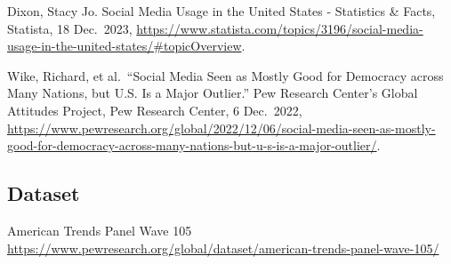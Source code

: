 \documentclass[
]{article}
\begin{document}
Dixon, Stacy Jo. Social Media Usage in the United States - Statistics \&
Facts, Statista, 18 Dec.~2023,
\url{https://www.statista.com/topics/3196/social-media-usage-in-the-united-states/\#topicOverview}.

Wike, Richard, et al.~``Social Media Seen as Mostly Good for Democracy
across Many Nations, but U.S. Is a Major Outlier.'' Pew Research
Center's Global Attitudes Project, Pew Research Center, 6 Dec.~2022,
\url{https://www.pewresearch.org/global/2022/12/06/social-media-seen-as-mostly-good-for-democracy-across-many-nations-but-u-s-is-a-major-outlier/}.

\hypertarget{dataset}{%
\subsection{Dataset}\label{dataset}}

American Trends Panel Wave 105
\url{https://www.pewresearch.org/global/dataset/american-trends-panel-wave-105/}
\end{document}
